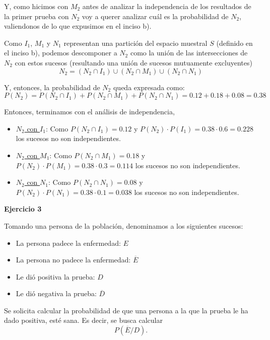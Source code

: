 \documentclass[11pt]{article}
\begin{document}
Y, como hicimos con $M_{2}$ antes de analizar la independencia de los resultados de la primer prueba con $N_{2}$ voy a querer analizar cu\'al es la probabilidad de $N_{2}$, valiendonos de lo que expusimos en el inciso b). 

Como $I_{1}$, $M_{1}$ y $N_{1}$ representan una partici\'on del espacio muestral $S$ (definido en el inciso b), podemos descomponer a $N_{2}$ como la uni\'on de las intersecciones de $N_{2}$ con estos sucesos (resultando una uni\'on de sucesos mutuamente excluyentes)
\[N_{2} = (N_{2} \cap I_{1}) \cup (N_{2} \cap M_{1}) \cup (N_{2} \cap N_{1}) \]

Y, entonces, la probabilidad de $N_{2}$ queda expresada como: 
\[P(N_{2}) = P(N_{2} \cap I_{1}) + P(N_{2} \cap M_{1}) + P(N_{2} \cap N_{1}) = 0.12 + 0.18 + 0.08 = 0.38 \]

Entonces, terminamos con el an\'alisis de independencia,

\begin{itemize}
    \item \underline{$N_{2}$ con $I_{1}$}: Como $P(N_{2}\cap I_{1}) = 0.12$ y $P(N_{2})\cdot P(I_{1}) = 0.38\cdot 0.6 = 0.228$ los sucesos no son independientes. 
    \item \underline{$N_{2}$ con $M_{1}$}: Como $P(N_{2}\cap M_{1}) = 0.18$ y $P(N_{2})\cdot P(M_{1}) = 0.38\cdot 0.3 = 0.114$ los sucesos no son independientes. 
    \item \underline{$N_{2}$ con $N_{1}$}: Como $P(N_{2}\cap N_{1}) = 0.08$ y $P(N_{2})\cdot P(N_{1}) = 0.38\cdot 0.1 = 0.038$ los sucesos no son independientes. 
\end{itemize}

\textbf{Ejercicio 3}

Tomando una persona de la poblaci\'on, denominamos a los siguientes sucesos: 
\begin{itemize}
    \item La persona padece la enfermedad: $E$
    \item La persona no padece la enfermedad: $\overline{E}$
    \item Le di\'o positiva la prueba: $D$
    \item Le di\'o negativa la prueba: $\overline{D}$
\end{itemize}

Se solicita calcular la probabilidad de que una persona a la que la prueba le ha dado positiva, est\'e sana. Es decir, se busca calcular $$P(\overline{E}/D).$$
\end{document}

